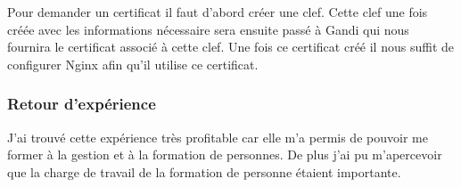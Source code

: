 Pour demander un certificat il faut d'abord créer une clef. Cette clef une fois créée avec les informations nécessaire sera ensuite passé à Gandi qui nous fournira le certificat associé à cette clef. Une fois ce certificat créé il nous suffit de configurer Nginx afin qu'il utilise ce certificat.

\subsubsection{Retour d'expérience}

J'ai trouvé cette expérience très profitable car elle m'a permis de pouvoir me former à la gestion et à la formation de personnes. De plus j'ai pu m’apercevoir que la charge de travail de la formation de personne étaient importante.
